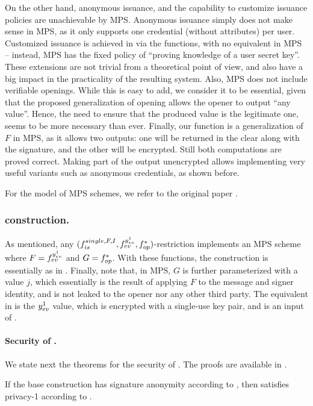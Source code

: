 On the other hand, anonymous issuance, and the capability to customize issuance
policies are unachievable by MPS. Anonymous issuance simply does not make sense
in MPS, as it only supports one credential (without attributes) per user.
Customized issuance is achieved in \UAS via the \fissue functions, with no
equivalent in MPS -- instead, MPS has the fixed policy of
``proving knowledge of a user secret key''. These extensions are not trivial
from a theoretical point of view, and also have a big impact in the practicality
of the resulting system. Also, MPS does not include verifiable openings. While
this is easy to add, we consider it to be essential, given that the proposed
generalization of opening allows the opener to output ``any value''. Hence, the
need to ensure that the produced value is the legitimate one, seems to be more
necessary than ever. Finally, our \feval function is a generalization of $F$ in
MPS, as it allows two outputs: one will be returned in the clear along with the
signature, and the other will be encrypted. Still both computations are proved
correct. Making part of the output unencrypted allows implementing very useful
variants such as anonymous credentials, as shown before.

For the model of MPS schemes, we refer to the original paper \cite{ngsy22}.

\subsubsection{\CUASMPS construction.} %
As mentioned, any $(f_{is}^{single,F,I},f_{ev}^{y_{ev}^1},
f_{op}^\ast)$-restriction implements an MPS scheme where $F=f_{ev}^{y_{ev}^1}$
and $G=f_{op}^\ast$. With these functions, the construction is essentially as in
.
%
Finally, note that, in MPS, $G$ is further parameterized with a value $j$, which
essentially is the result of applying $F$ to the message and signer identity,
and is not leaked to the opener nor any other third party. The equivalent in
\UAS is the $y_{ev}^1$ value, which is encrypted with a single-use key pair, and
is an input of \yinsp.

\paragraph{Security of \CUASMPS.} %
We state next the theorems for the security of \CUASMPS. The proofs are
available in .

\begin{theorem}
  If the base \CUASGen construction has signature anonymity according to
  , then \CUASMPS satisfies privacy-1
  according to \cite{ngsy22}.
\end{theorem}

